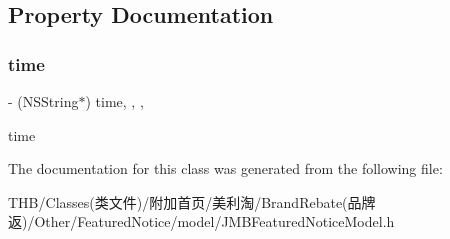 \subsection{Property Documentation}
\mbox{\label{interface_j_m_b_featured_notice_model_adf2aacf68a6e6c1ccecb72e3d7943132}} 
\subsubsection{\texorpdfstring{time}{time}}
{\footnotesize\ttfamily -\/ (N\+S\+String$\ast$) time\hspace{0.3cm}{\ttfamily [read]}, {\ttfamily [write]}, {\ttfamily [nonatomic]}, {\ttfamily [copy]}}

time 

The documentation for this class was generated from the following file\+:\begin{DoxyCompactItemize}
\item 
T\+H\+B/\+Classes(类文件)/附加首页/美利淘/\+Brand\+Rebate(品牌返)/\+Other/\+Featured\+Notice/model/J\+M\+B\+Featured\+Notice\+Model.\+h\end{DoxyCompactItemize}
